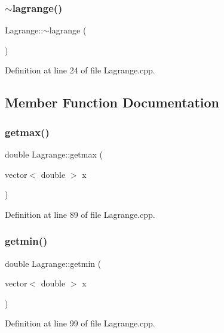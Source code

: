 \subsubsection{\texorpdfstring{$\sim$lagrange()}{~lagrange()}}
{\footnotesize\ttfamily Lagrange\+::$\sim$lagrange (\begin{DoxyParamCaption}{ }\end{DoxyParamCaption})\hspace{0.3cm}{\ttfamily [virtual]}}



Definition at line 24 of file Lagrange.\+cpp.



\subsection{Member Function Documentation}
\mbox{\label{class_lagrange_a22e6ca4f6b778698472094238063538f}} 
\subsubsection{\texorpdfstring{getmax()}{getmax()}}
{\footnotesize\ttfamily double Lagrange\+::getmax (\begin{DoxyParamCaption}\item[{vector$<$ double $>$}]{x }\end{DoxyParamCaption})}



Definition at line 89 of file Lagrange.\+cpp.

\mbox{\label{class_lagrange_a7eb566fad6ddd9fa7968b3936327ae7c}} 
\subsubsection{\texorpdfstring{getmin()}{getmin()}}
{\footnotesize\ttfamily double Lagrange\+::getmin (\begin{DoxyParamCaption}\item[{vector$<$ double $>$}]{x }\end{DoxyParamCaption})}



Definition at line 99 of file Lagrange.\+cpp.

\mbox{\label{class_lagrange_a800ccde577cdf59701d99ac505f087c4}} 
